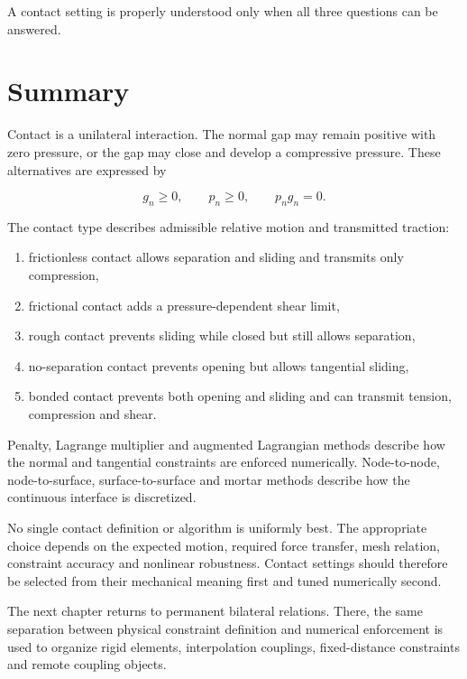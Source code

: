 A contact setting is properly understood only when all three questions can be
answered.


\section{Summary}

Contact is a unilateral interaction. The normal gap may remain positive with
zero pressure, or the gap may close and develop a compressive pressure. These
alternatives are expressed by

\begin{equation}
    g_n \geq 0, \qquad p_n \geq 0, \qquad p_n g_n=0.
\end{equation}

The contact type describes admissible relative motion and transmitted traction:

\begin{enumerate}
    \item frictionless contact allows separation and sliding and transmits only
        compression,
    \item frictional contact adds a pressure-dependent shear limit,
    \item rough contact prevents sliding while closed but still allows separation,
    \item no-separation contact prevents opening but allows tangential sliding,
    \item bonded contact prevents both opening and sliding and can transmit
        tension, compression and shear.
\end{enumerate}

Penalty, Lagrange multiplier and augmented Lagrangian methods describe how the
normal and tangential constraints are enforced numerically. Node-to-node,
node-to-surface, surface-to-surface and mortar methods describe how the
continuous interface is discretized.

No single contact definition or algorithm is uniformly best. The appropriate
choice depends on the expected motion, required force transfer, mesh relation,
constraint accuracy and nonlinear robustness. Contact settings should therefore
be selected from their mechanical meaning first and tuned numerically second.

The next chapter returns to permanent bilateral relations. There, the same
separation between physical constraint definition and numerical enforcement is
used to organize rigid elements, interpolation couplings, fixed-distance
constraints and remote coupling objects.
